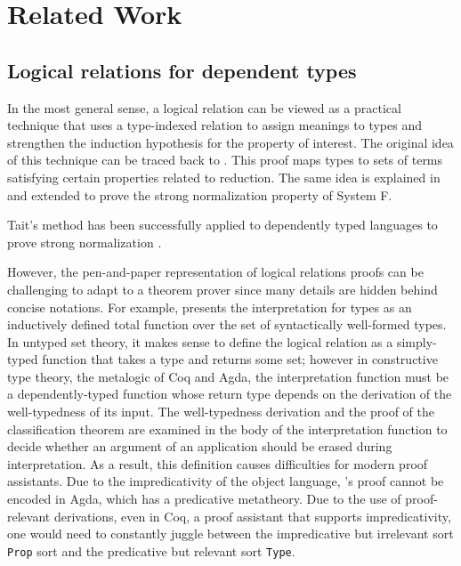 \documentclass[acmsmall,screen=true,
\ifpublic review=false\else,review=true\fi
  ,anonymous=\ifanonymous true\else false\fi]{acmart}
\newcommand{\scw}[1]{}
\newcommand{\yl}[1]{}
\begin{document}
\section{Related Work}
\label{sec:relatedwork}



\subsection{Logical relations for dependent types}
In the most general sense, a logical relation can be viewed as a
practical technique that uses a type-indexed relation to assign
meanings to types and strengthen the induction hypothesis for the
property of interest. The original idea of this technique can be
traced back to
\citet{tait1967:reducibility}. This proof maps
types to sets of terms satisfying certain properties related to reduction.
The same idea is explained in \citet{girard1989proofs} and extended to
prove the strong normalization property of System F.

Tait's method has been successfully applied to dependently typed
languages to prove strong normalization \cite{Martin-Lof-1973,luo1990extended,geuvers1994short, barendregt:lambda-calculi-with-types}.

However, the pen-and-paper representation of logical relations proofs
can be challenging to adapt to a theorem prover since many details
are hidden behind concise notations.
For example, \citet{geuvers1994short} presents the interpretation for types as
an inductively defined total function over the set of syntactically
well-formed types. \scw{The issue is that Geuver's metalogic is (untyped) set
theory, but Coq and Agda use type theory.}
In untyped set theory, it makes sense to define the logical relation as a
simply-typed function that takes a type and returns some set; however
in constructive type theory, the metalogic of Coq and Agda, the
interpretation function must be a dependently-typed function whose
return type depends on the derivation of the well-typedness of its
input. The well-typedness derivation and the proof of the
classification theorem\scw{what is the classification theorem}\yl{It
  says all well-formed terms A (either G |- A : .. or G |- .. : A)
then A is either an object, a type, or a kind. The classification is
used to guide erasure}
are examined in the body
of the interpretation function to decide whether an argument of an
application should be erased during interpretation. As a result, this
definition causes difficulties for modern proof assistants.
Due to the
impredicativity of the object language, \citet{geuvers1994short}'s
proof cannot be encoded in Agda, which has a predicative
metatheory. Due to the use of proof-relevant derivations, even in
Coq, a proof assistant that supports impredicativity, one would need
to constantly juggle between the impredicative but irrelevant sort
\texttt{Prop} sort and the predicative but relevant sort
\texttt{Type}.
\end{document}
